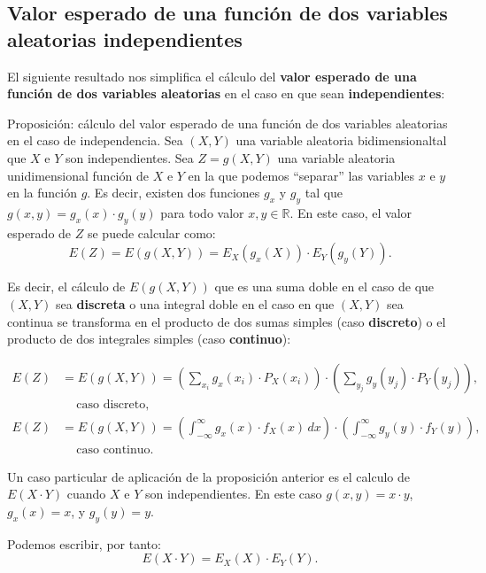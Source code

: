 \documentclass[]{book}
\begin{document}
\hypertarget{valor-esperado-de-una-funciuxf3n-de-dos-variables-aleatorias-independientes}{%
\subsection{Valor esperado de una función de dos variables aleatorias independientes}\label{valor-esperado-de-una-funciuxf3n-de-dos-variables-aleatorias-independientes}}

El siguiente resultado nos simplifica el cálculo del \textbf{valor esperado de una función de dos variables aleatorias} en el caso en que sean \textbf{independientes}:

Proposición: cálculo del valor esperado de una función de dos variables aleatorias en el caso de independencia.
Sea \((X,Y)\) una variable aleatoria bidimensionaltal que \(X\) e \(Y\) son independientes.
Sea \(Z=g(X,Y)\) una variable aleatoria unidimensional función de \(X\) e \(Y\) en la que podemos ``separar'' las variables \(x\) e \(y\) en la función \(g\). Es decir, existen dos funciones \(g_x\) y \(g_y\) tal que \(g(x,y)=g_x(x)\cdot g_y(y)\) para todo valor \(x,y\in\mathbb{R}\). En este caso, el valor esperado de \(Z\) se puede calcular como:
\[
E(Z)=E(g(X,Y))=E_X(g_x(X))\cdot E_Y(g_y(Y)).
\]

Es decir, el cálculo de \(E(g(X,Y))\) que es una suma doble en el caso de que \((X,Y)\) sea \textbf{discreta} o una integral doble en el caso en que \((X,Y)\) sea continua se transforma en el producto de dos sumas simples (caso \textbf{discreto}) o el producto de dos integrales simples (caso \textbf{continuo}):

\[
\begin{array}{rl}
E(Z) & =E(g(X,Y))=\displaystyle\left(\sum_{x_i} g_x(x_i)\cdot P_X(x_i)\right)\cdot \left(\sum_{y_j} g_y(y_j)\cdot P_Y(y_j)\right),\\ &\ \quad \mbox{caso discreto},\\
E(Z) & =E(g(X,Y))=\displaystyle\left(\int_{-\infty}^\infty g_x(x)\cdot f_X(x)\, dx\right)\cdot \left(\int_{-\infty}^\infty g_y(y)\cdot f_Y(y)\right), \\  &\ \quad \mbox{caso continuo}.
\end{array}
\]

Un caso particular de aplicación de la proposición anterior es el calculo de \(E(X\cdot Y)\) cuando \(X\) e \(Y\) son independientes. En este caso \(g(x,y)=x\cdot y\), \(g_x(x)=x\), y \(g_y(y)=y\).

Podemos escribir, por tanto:
\[
E(X\cdot Y)=E_X(X)\cdot E_Y(Y).
\]
\end{document}
